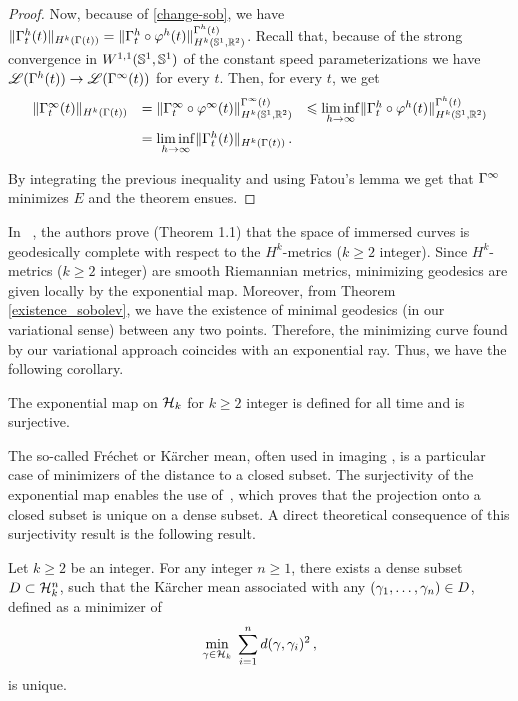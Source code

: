 \begin{proof}
Now, because of \eqref{change-sob}, we have
$ \|\Gamma^{h}_t(t)\|_{H^k(\Gamma(t))}= \| \Gamma^h_t \circ \varphi^h (t)\|^{\Gamma^h(t)}_{H^k(\mathbb{S}^1,\mathbb{R}^2)}$. Recall that, because of the strong convergence in $W^{1,1}(\mathbb{S}^1, \mathbb{S}^1)$ of the  constant speed parameterizations we have $\mathscr{L}(\Gamma^h(t))\rightarrow \mathscr{L}(\Gamma^\infty(t))$ for every $t$. 
Then, for every $t$, we get
$$
\begin{array}{lll}
	\| \GA^{\infty}_t(t)\|_{\hsgt} &=  \| \GA^\infty_t \circ \phi^\infty(t) \|^{\GA^{\infty}(t)}_{\hs}   
	&\leq \underset{h\rightarrow \infty}{\liminf}  \| \GA^h_t \circ \phi^h (t)\|^{\GA^h(t)}_{\hs}	\vspace{0.2cm} \\
&=\underset{h\rightarrow \infty}{\liminf} \|\GA^{h}_t(t)\|_{\hsgt}\,.&\\
\end{array}
$$

By integrating the previous inequality and using Fatou's lemma we get that $\Gamma^\infty$ minimizes $E$ and the theorem ensues.
\end{proof}


In ~\cite{Bruveris}, the authors prove (Theorem 1.1) that the space of immersed curves is geodesically complete with respect to the $H^k$-metrics ($k\geq 2$ integer). 
Since $H^k$-metrics ($k\geq 2$ integer) are smooth Riemannian metrics, minimizing geodesics are given locally by the exponential map.
Moreover, from Theorem \ref{existence_sobolev}, we have the existence of minimal geodesics (in our variational sense) between any two points. Therefore, the minimizing curve found by our variational approach coincides with an exponential ray. Thus, we have the following corollary.

\begin{cor} 
The exponential map on $\mathcal{H}_k$ for $k \geq 2$ integer is defined for all time and is surjective.
\end{cor}


The so-called Fr\'echet or K\"archer mean, often used in imaging \cite{Pennec}, is a particular case of minimizers of the distance to a closed subset. The surjectivity of the exponential map enables the use of~\cite[Theorem 3.5]{Azagra}, which proves that the projection onto a closed subset is unique on a dense subset.
A direct theoretical consequence of this surjectivity result is the following result. 

\begin{prop}
Let $k\geq 2$ be an integer.
For any integer $n\geq 1$, there exists a dense subset $D \subset \mathcal{H}_k^n$, such that the K\"archer mean associated with any $ (\gamma_1,\ldots,\gamma_n) \in D$, defined as a minimizer of 
\begin{equation}
	\min_{\gamma \in \mathcal{H}_k} \;  \sum_{i=1}^n d(\gamma , \gamma_i)^2\,,
\end{equation}
is unique.
\end{prop} 

